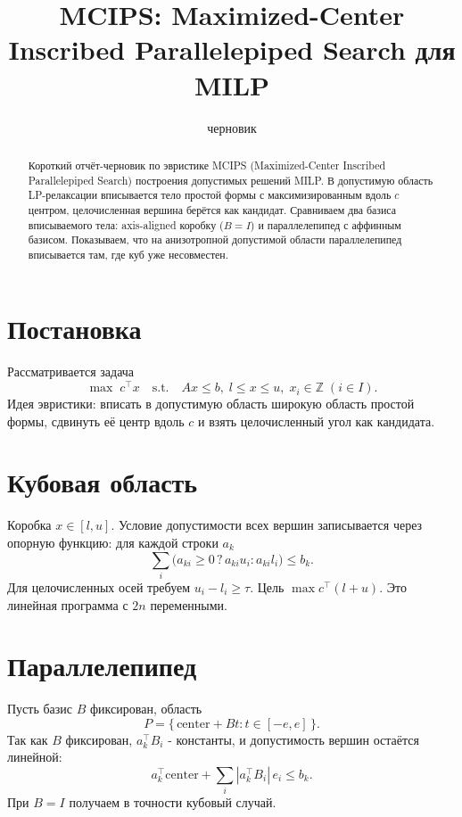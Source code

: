 \documentclass[11pt]{article}
\title{MCIPS: Maximized-Center Inscribed Parallelepiped Search для MILP}
\author{черновик}
\date{}
\begin{document}
\maketitle

\begin{abstract}
Короткий отчёт-черновик по эвристике MCIPS (Maximized-Center Inscribed
Parallelepiped Search) построения допустимых решений MILP. В допустимую область
LP-релаксации вписывается тело простой формы с максимизированным вдоль $c$
центром, целочисленная вершина берётся как кандидат. Сравниваем два базиса
вписываемого тела: axis-aligned коробку ($B=I$) и параллелепипед с аффинным
базисом. Показываем, что на анизотропной допустимой области параллелепипед
вписывается там, где куб уже несовместен.
\end{abstract}

\section{Постановка}

Рассматривается задача
\begin{equation}
\max\; c^\top x \quad \text{s.t.} \quad A x \le b,\; l \le x \le u,\;
x_i \in \mathbb{Z}\; (i \in I).
\end{equation}
Идея эвристики: вписать в допустимую область широкую область простой формы,
сдвинуть её центр вдоль $c$ и взять целочисленный угол как кандидата.

\section{Кубовая область}

Коробка $x \in [l, u]$. Условие допустимости всех вершин записывается через
опорную функцию: для каждой строки $a_k$
\begin{equation}
\sum_i \big( a_{ki} \ge 0 \,?\, a_{ki} u_i : a_{ki} l_i \big) \le b_k .
\end{equation}
Для целочисленных осей требуем $u_i - l_i \ge \tau$. Цель $\max c^\top(l+u)$.
Это линейная программа с $2n$ переменными.

\section{Параллелепипед}

Пусть базис $B$ фиксирован, область
\begin{equation}
P = \{\, \mathrm{center} + B t : t \in [-e, e] \,\}.
\end{equation}
Так как $B$ фиксирован, $a_k^\top B_i$ - константы, и допустимость вершин
остаётся линейной:
\begin{equation}
a_k^\top \mathrm{center} + \sum_i |a_k^\top B_i|\, e_i \le b_k .
\end{equation}
При $B = I$ получаем в точности кубовый случай.
\end{document}
